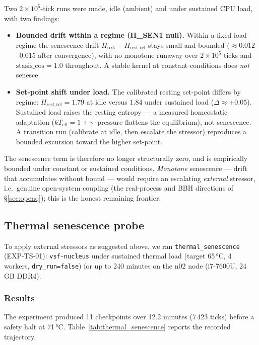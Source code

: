 \documentclass[11pt, a4paper]{article}
\newcommand{\nucleus}{\texttt{vsf-nucleus}}
\begin{document}
Two $2\times10^5$-tick runs were made, idle (ambient) and under sustained CPU
load, with two findings:
\begin{itemize}
  \item \textbf{Bounded drift within a regime (H\_SEN1 null).} Within a fixed
    load regime the senescence drift $H_\text{rest}-H_\text{rest\_ref}$ stays
    small and bounded ($\approx0.012$--$0.015$ after convergence), with no
    monotone runaway over $2\times10^5$ ticks and $\text{stasis\_cos}=1.0$
    throughout. A stable kernel at constant conditions does \emph{not} senesce.
  \item \textbf{Set-point shift under load.} The calibrated resting set-point
    differs by regime: $H_\text{rest\_ref}=1.79$ at idle versus $1.84$ under
    sustained load ($\Delta\approx+0.05$). Sustained load raises the resting
    entropy --- a measured homeostatic adaptation ($kT_\text{eff}=1+\gamma\cdot
    \text{pressure}$ flattens the equilibrium), not senescence. A transition
    run (calibrate at idle, then escalate the stressor) reproduces a bounded
    excursion toward the higher set-point.
\end{itemize}

The senescence term is therefore no longer structurally zero, and is empirically
bounded under constant or sustained conditions. \emph{Monotone} senescence ---
drift that accumulates without bound --- would require an escalating
\emph{external} stressor, i.e.\ genuine open-system coupling (the real-process
and BBH directions of \S\ref{sec:openq}); this is the honest remaining frontier.

\subsection{Thermal senescence probe}
\label{sec:thermalsenescence}

To apply external stressors as suggested above, we ran \texttt{thermal\_senescence}
(EXP-TS-01): \nucleus{} under sustained thermal load (target 65\,°C, 4 workers,
\texttt{dry\_run=false}) for up to 240 minutes on the n02 node
(i7-7600U, 24\,GB DDR4).

\subsubsection*{Results}

The experiment produced 11 checkpoints over 12.2 minutes (7\,423 ticks) before a
safety halt at 71\,°C.
Table~\ref{tab:thermal_senescence} reports the recorded trajectory.
\end{document}
